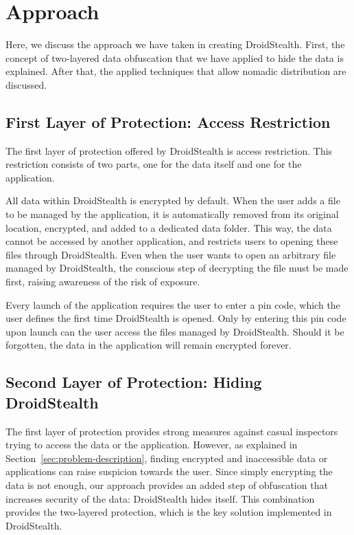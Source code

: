 \section{Approach}
\label{sec:approach}
Here, we discuss the approach we have taken in creating DroidStealth. 
First, the concept of two-layered data obfuscation that we have applied to hide the data is explained.
After that, the applied techniques that allow nomadic distribution are discussed.


\subsection{First Layer of Protection: Access Restriction}
The first layer of protection offered by DroidStealth is access restriction.
This restriction consists of two parts, one for the data itself and one for the application.

All data within DroidStealth is encrypted by default.
When the user adds a file to be managed by the application, it is automatically removed from its original location, encrypted, and added to a dedicated data folder.
This way, the data cannot be accessed by another application, and restricts users to opening these files through DroidStealth.
Even when the user wants to open an arbitrary file managed by DroidStealth, the conscious step of decrypting the file must be made first, raising awareness of the risk of exposure.

Every launch of the application requires the user to enter a pin code, which the user defines the first time DroidStealth is opened.
Only by entering this pin code upon launch can the user access the files managed by DroidStealth. Should it be forgotten, the data in the application will remain encrypted forever.

\subsection{Second Layer of Protection: Hiding DroidStealth}
The first layer of protection provides strong measures against casual inspectors trying to access the data or the application.
However, as explained in Section~\ref{sec:problem-description}, finding encrypted and inaccessible data or applications can raise suspicion towards the user.
Since simply encrypting the data is not enough, our approach provides an added step of obfuscation that increases security of the data: DroidStealth hides itself.
This combination provides the two-layered protection, which is the key solution implemented in DroidStealth.

